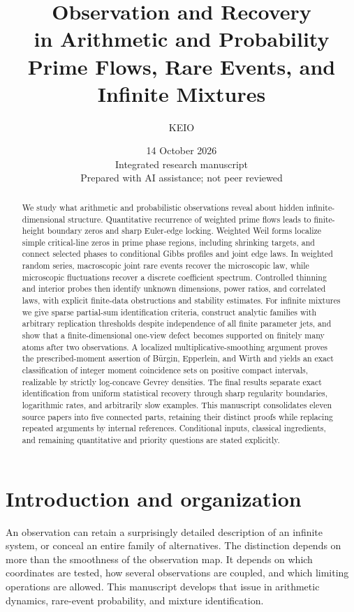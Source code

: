 \documentclass[11pt,letterpaper]{article}
\title{Observation and Recovery\\in Arithmetic and Probability\\[5pt]
\large Prime Flows, Rare Events, and Infinite Mixtures}
\author{KEIO}
\date{14 October 2026\\\small Integrated research manuscript\\
\small Prepared with AI assistance; not peer reviewed}
\theoremstyle{definition}
\theoremstyle{remark}
\newcommand{\1}{\mathbf 1}
\begin{document}
\maketitle
\begin{abstract}
We study what arithmetic and probabilistic observations reveal about
hidden infinite-dimensional structure. Quantitative recurrence of weighted
prime flows leads to finite-height boundary zeros and sharp Euler-edge
locking. Weighted Weil forms localize simple critical-line zeros in prime
phase regions, including shrinking targets, and connect selected phases
to conditional Gibbs profiles and joint edge laws. In weighted random
series, macroscopic joint rare events recover the microscopic law, while
microscopic fluctuations recover a discrete coefficient spectrum.
Controlled thinning and interior probes then identify unknown dimensions,
power ratios, and correlated laws, with explicit finite-data obstructions
and stability estimates. For infinite mixtures we give sparse
partial-sum identification criteria, construct analytic families with
arbitrary replication thresholds despite independence of all finite
parameter jets, and show that a finite-dimensional one-view defect
becomes supported on finitely many atoms after two observations.
A localized multiplicative-smoothing argument
proves the prescribed-moment assertion of B\"urgin, Epperlein, and Wirth
and yields an exact classification of integer moment coincidence sets
on positive compact intervals, realizable by strictly log-concave
Gevrey densities. The final results separate
exact identification from uniform statistical recovery through sharp
regularity boundaries, logarithmic rates, and arbitrarily slow examples.
This manuscript consolidates eleven source papers into five connected
parts, retaining their distinct proofs while replacing repeated arguments
by internal references. Conditional inputs, classical ingredients, and
remaining quantitative and priority questions are stated explicitly.
\end{abstract}
\clearpage
\section*{Introduction and organization}
\label{sec:integrated-introduction}

An observation can retain a surprisingly detailed description of an
infinite system, or conceal an entire family of alternatives. The
distinction depends on more than the smoothness of the observation
map. It depends on which coordinates are tested, how several
observations are coupled, and which limiting operations are allowed.
This manuscript develops that issue in arithmetic dynamics, rare-event
probability, and mixture identification.
\end{document}
